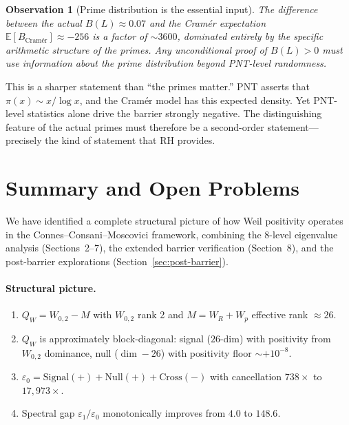 \documentclass[11pt,a4paper]{article}
\newtheorem{observation}{Observation}[section]
\begin{document}
\begin{observation}[Prime distribution is the essential input]
The difference between the actual $B(L) \approx 0.07$ and the Cram\'er expectation $\mathbb{E}[B_{\text{Cram\'er}}] \approx -256$ is a factor of $\sim 3600$, dominated entirely by the specific arithmetic structure of the primes. Any unconditional proof of $B(L) > 0$ must use information about the prime distribution beyond PNT-level randomness.
\end{observation}

This is a sharper statement than ``the primes matter.'' PNT asserts that $\pi(x) \sim x/\log x$, and the Cram\'er model has this expected density. Yet PNT-level statistics alone drive the barrier strongly negative. The distinguishing feature of the actual primes must therefore be a second-order statement---precisely the kind of statement that RH provides.

\section{Summary and Open Problems}

We have identified a complete structural picture of how Weil positivity operates in the Connes--Consani--Moscovici framework, combining the 8-level eigenvalue analysis (Sections~2--7), the extended barrier verification (Section~8), and the post-barrier explorations (Section~\ref{sec:post-barrier}).

\paragraph{Structural picture.}
\begin{enumerate}
\item $Q_W = W_{0,2} - M$ with $W_{0,2}$ rank 2 and $M = W_R + W_p$ effective rank $\approx 26$.
\item $Q_W$ is approximately block-diagonal: signal ($26$-dim) with positivity from $W_{0,2}$ dominance, null ($\dim - 26$) with positivity floor $\sim +10^{-8}$.
\item $\varepsilon_0 = \mathrm{Signal}(+) + \mathrm{Null}(+) + \mathrm{Cross}(-)$ with cancellation $738\times$ to $17{,}973\times$.
\item Spectral gap $\varepsilon_1/\varepsilon_0$ monotonically improves from $4.0$ to $148.6$.
\end{enumerate}
\end{document}
